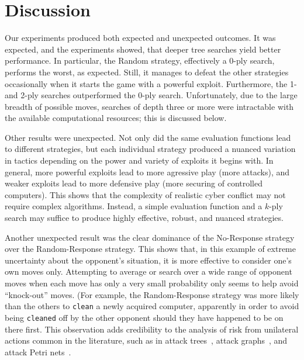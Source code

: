 \documentclass{sig-alternate-05-2015}
\begin{document}
\section{Discussion}
\label{sec:discussion}
Our experiments produced both expected and unexpected 
outcomes. It was expected, and the experiments showed, that deeper
tree searches yield better performance. In particular, the Random
strategy, effectively a 0-ply search, performs the worst, as
expected. Still, it manages to defeat the other strategies
occasionally when it starts the game with a powerful
exploit. Furthermore, the 1- and 2-ply searches outperformed the 0-ply
search.  Unfortunately, due to the large breadth of possible moves,
searches of depth three or more were intractable with the available
computational resources; this is discussed below.

Other results were unexpected. Not only did the same evaluation
functions lead to different strategies, but each individual strategy
produced a nuanced variation in tactics depending on the power and
variety of exploits it
begins with. 
In general, more powerful exploits lead to more agressive
play (more attacks), and weaker exploits lead to more defensive play
(more securing of controlled computers). This shows that the
complexity of realistic cyber conflict may not require
complex algorithms. Instead, a simple evaluation function and a
$k$-ply search may suffice to produce highly effective, robust, and
nuanced strategies.

Another unexpected result was the clear dominance of the No-Response
strategy over the Random-Response strategy. This shows that, in this
example of extreme uncertainty about the opponent's situation, it is
more effective to consider one's own moves only. Attempting to average
or search over a wide range of opponent moves when each move has only
a very small probability only seems to help avoid ``knock-out''
moves. (For example, the Random-Response strategy was more likely than
the others to {\tt clean} a newly acquired computer, apparently in
order to avoid being {\tt cleaned} off by the other opponent should
they have happened to be on there first. This observation adds
credibility to the analysis of risk from unilateral actions common in the
literature, such as in attack trees~\cite{schneier1999attack}, attack
graphs~\cite{sheyner2002automated}, and attack Petri
nets~\cite{zakrzewska2011modeling}.
\end{document}
